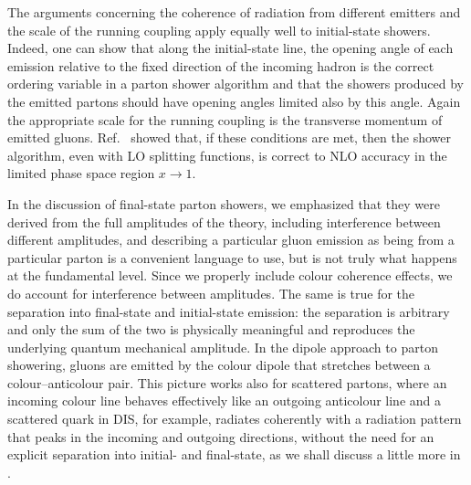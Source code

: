 The arguments concerning the coherence of radiation from different
emitters and the scale of the running coupling apply equally well to
initial-state showers.  Indeed, one can show that along the
initial-state line, the opening angle of each emission relative to the
fixed direction of the incoming hadron is the correct ordering
variable \cite{Marchesini:1987cf} in a parton shower algorithm
and that the showers produced by the emitted
partons should have opening angles limited also by this angle.  Again
the appropriate scale for the running coupling is the transverse
momentum of emitted gluons.  Ref.~\cite{Catani:1990rr} showed that,
if these conditions are met, then the shower algorithm, even with LO
splitting functions, is correct to NLO accuracy in the limited phase
space region $x\to1$.

In the discussion of final-state parton showers, we emphasized that they
were derived from the full amplitudes of the theory, including
interference between different amplitudes, and describing a particular
gluon emission as being from a particular parton is a convenient
language to use, but is not truly what happens at the fundamental
level.  Since we properly include colour coherence effects, we do
account for interference between amplitudes.  The same is true for the
separation into final-state and initial-state emission: the separation
is arbitrary and only the sum of the two is physically meaningful and
reproduces the underlying quantum mechanical amplitude.  In the dipole
approach to parton showering, gluons are emitted by the colour dipole
that stretches between a colour--anticolour pair.  This picture works
also for scattered partons, where an incoming colour line behaves
effectively like an outgoing anticolour line and a scattered quark in
DIS, for example, radiates coherently with a radiation pattern that
peaks in the incoming and outgoing directions, without the need for an
explicit separation into initial- and final-state, as we shall discuss a
little more in .

